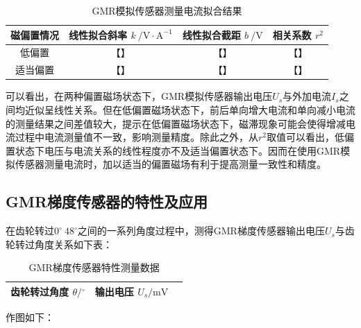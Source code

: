 \documentclass{thuemp}
\begin{document}
\begin{table}[H]
    \centering
    \captionnamefont{\wuhao\bf\heiti}
    \captiontitlefont{\wuhao\bf\heiti}
    \caption{GMR模拟传感器测量电流拟合结果} \label{tab:gmr_current_fit}
    \liuhao
    \begin{tabular}{|c|c|c|c|}
        \toprule
        磁偏置情况 & 线性拟合斜率 $k ~ /\mathrm{V\cdot A^{-1}} $ & 线性拟合截距 $b ~ /\mathrm{V}$ & 相关系数 $r^2$ \\ \hline
        低偏置 & 【】 & 【】 & 【】 \\ \hline
        适当偏置 & 【】 & 【】 & 【】 \\ \hline
        \midrule
        \bottomrule
    \end{tabular}
\end{table}

可以看出，在两种偏置磁场状态下，GMR模拟传感器输出电压$U_s$与外加电流$I_s$之间均近似呈线性关系。但在低偏置磁场状态下，前后单向增大电流和单向减小电流的测量结果之间差值较大，提示在低偏置磁场状态下，磁滞现象可能会使得增减电流过程中电流测量值不一致，影响测量精度。除此之外，从$r^2$取值可以看出，低偏置状态下电压与电流关系的线性程度亦不及适当偏置状态下。因而在使用GMR模拟传感器测量电流时，加以适当的偏置磁场有利于提高测量一致性和精度。

\subsection{GMR梯度传感器的特性及应用}

在齿轮转过$0^\circ~48^\circ$之间的一系列角度过程中，测得GMR梯度传感器输出电压$U_s$与齿轮转过角度关系如下表：

\begin{table}[H]
    \centering
    \captionnamefont{\wuhao\bf\heiti}
    \captiontitlefont{\wuhao\bf\heiti}
    \caption{GMR梯度传感器特性测量数据} \label{tab:gmr_gradient}
    \liuhao
    \begin{tabular}{|c|c|c|}
        \toprule
        齿轮转过角度 $\theta/\mathrm{^\circ}$ & 输出电压 $U_s/\mathrm{mV}$ \\ \hline
        \midrule
        \bottomrule
    \end{tabular}
\end{table}

作图如下：

\end{document}
